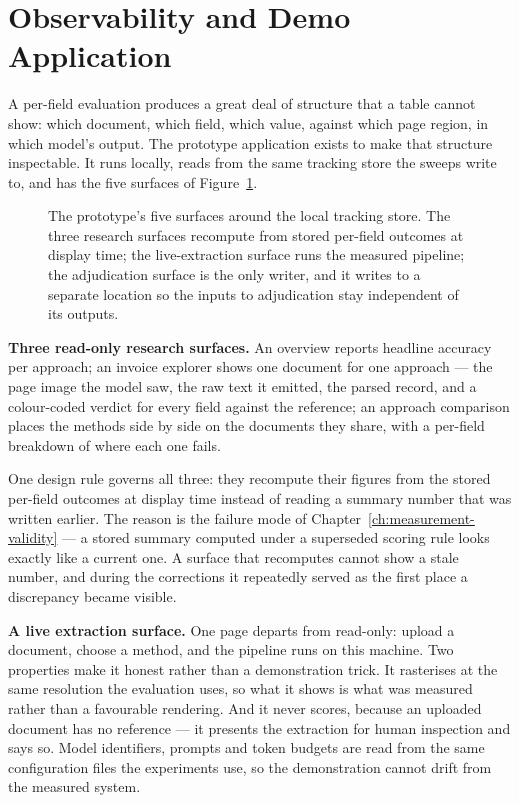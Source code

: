 \section{Observability and Demo Application}
\label{sec:sys-app}

A per-field evaluation produces a great deal of structure that a table cannot show: which
document, which field, which value, against which page region, in which model's output. The
prototype application exists to make that structure inspectable. It runs locally, reads from
the same tracking store the sweeps write to, and has the five surfaces of
Figure~\ref{fig:app-surfaces}.

\begin{figure}[htbp]
  \centering
  
  \caption[The prototype's five surfaces]{The prototype's five surfaces around the local
  tracking store. The three research surfaces recompute from stored per-field outcomes at
  display time; the live-extraction surface runs the measured pipeline; the adjudication
  surface is the only writer, and it writes to a separate location so the inputs to
  adjudication stay independent of its outputs.}
  \label{fig:app-surfaces}
\end{figure}

\textbf{Three read-only research surfaces.} An overview reports headline accuracy per
approach; an invoice explorer shows one document for one approach --- the page image the model
saw, the raw text it emitted, the parsed record, and a colour-coded verdict for every field
against the reference; an approach comparison places the methods side by side on the documents
they share, with a per-field breakdown of where each one fails.

One design rule governs all three: they recompute their figures from the stored per-field
outcomes at display time instead of reading a summary number that was written earlier. The
reason is the failure mode of Chapter~\ref{ch:measurement-validity} --- a stored summary
computed under a superseded scoring rule looks exactly like a current one. A surface that
recomputes cannot show a stale number, and during the corrections it repeatedly served as the
first place a discrepancy became visible.

\textbf{A live extraction surface.} One page departs from read-only: upload a document, choose
a method, and the pipeline runs on this machine. Two properties make it honest rather than a
demonstration trick. It rasterises at the same resolution the evaluation uses, so what it shows
is what was measured rather than a favourable rendering. And it never scores, because an
uploaded document has no reference --- it presents the extraction for human inspection and
says so. Model identifiers, prompts and token budgets are read from the same configuration
files the experiments use, so the demonstration cannot drift from the measured system.

